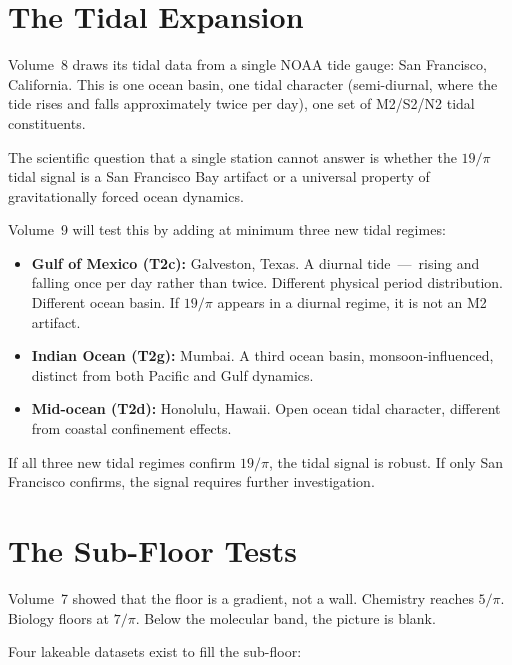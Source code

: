 \documentclass[11pt, letterpaper, openany]{book}
\begin{document}
\section{The Tidal Expansion}

Volume~8 draws its tidal data from a single NOAA tide gauge: San Francisco,
California. This is one ocean basin, one tidal character (semi-diurnal, where the
tide rises and falls approximately twice per day), one set of M2/S2/N2 tidal
constituents.

The scientific question that a single station cannot answer is whether the $19/\pi$
tidal signal is a San Francisco Bay artifact or a universal property of
gravitationally forced ocean dynamics.

Volume~9 will test this by adding at minimum three new tidal regimes:

\begin{itemize}
\item \textbf{Gulf of Mexico (T2c):} Galveston, Texas. A diurnal tide~---~rising
      and falling once per day rather than twice. Different physical period
      distribution. Different ocean basin. If $19/\pi$ appears in a diurnal
      regime, it is not an M2 artifact.
\item \textbf{Indian Ocean (T2g):} Mumbai. A third ocean basin, monsoon-influenced,
      distinct from both Pacific and Gulf dynamics.
\item \textbf{Mid-ocean (T2d):} Honolulu, Hawaii. Open ocean tidal character,
      different from coastal confinement effects.
\end{itemize}

If all three new tidal regimes confirm $19/\pi$, the tidal signal is robust. If
only San Francisco confirms, the signal requires further investigation.

\section{The Sub-Floor Tests}

Volume~7 showed that the floor is a gradient, not a wall. Chemistry reaches
$5/\pi$. Biology floors at $7/\pi$. Below the molecular band, the picture is blank.

Four lakeable datasets exist to fill the sub-floor:
\end{document}
